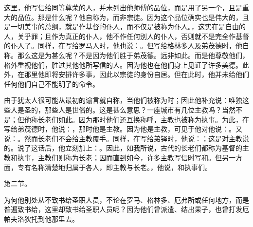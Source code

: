 \par

\par

这里，他写信给同等尊荣的人，并未列出他师傅的品位，而是用了另一个，且是重大的品位。那是什么呢？他自称为，而非宗徒。因为这个品位确实也是伟大的，且是一切美事的总纲，就是作基督的仆人，而不仅是被称为仆人。，这实在是自由的人，关乎罪；且作为真正的仆人，他不作任何别人的仆人，否则就不是完全作基督的仆人了。同样，在写给罗马人时，他也说：。但写给格林多人及弟茂德时，他自称。那么这是为甚么呢？不是因为他们胜于弟茂德。远非如此。而是他尊敬他们，格外重视他们，胜过其他他所写信的人。因为他也在他们身上见证了许多美德。此外，在那里他即将安排许多事，因此以宗徒的身份自居。但在此时，他并未给他们任何他们自己不能明了的命令。\par

由于犹太人很可能从最初的谕言就自称，当他们被称为时；因此他补充说：唯独这些人是圣的，那些人是世俗的。这是甚么意思？一座城市有几位主教吗？当然不是；但他称长老们如此。因为那时他们还互换称呼，主教也被称为执事。为此，在写给弟茂德时，他说：，那时他是主教。因为他是主教，可见于他对他说：。又说：。然而长老们不会给主教覆手。同样，在写给弟铎时，他说：；这是对主教说的。说了这话后，他立刻加上：。因此，如我所说，古代的长老们都称为基督的主教和执事，主教们则称为长老；因而直到如今，许多主教写信时写和。但另一方面，专有名称清楚地归属于各人，即主教与长老。，他说，和执事们。\par

第二节。\par

为何他别处从不致书给圣职人员，不论在罗马、格林多、厄弗所或任何地方，而是普遍致书给，这里却致书给圣职人员呢？因为他们曾派遣、结出果子，也曾打发厄帕夫洛狄托到他那里去。\par

